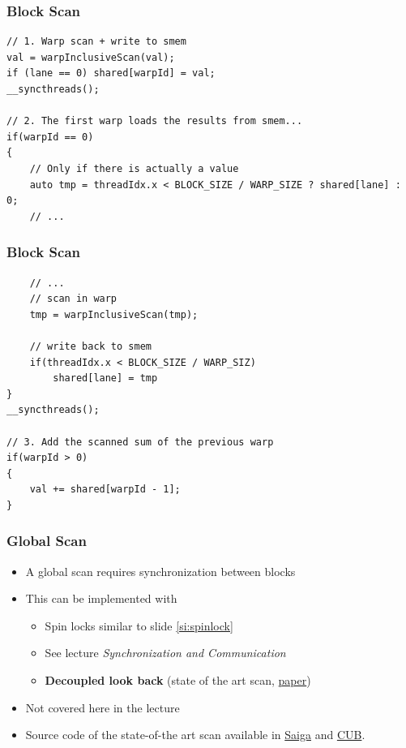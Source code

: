 \documentclass[aspectratio=169,handout]{beamer}
\begin{document}
\begin{frame}[fragile]
\frametitle{Block Scan}

\begin{lstlisting}
// 1. Warp scan + write to smem
val = warpInclusiveScan(val);
if (lane == 0) shared[warpId] = val;
__syncthreads();

// 2. The first warp loads the results from smem...
if(warpId == 0)
{
	// Only if there is actually a value
	auto tmp = threadIdx.x < BLOCK_SIZE / WARP_SIZE ? shared[lane] : 0;
	// ...
\end{lstlisting}
\end{frame}


\begin{frame}[fragile]
\frametitle{Block Scan}


\begin{lstlisting}
	// ...
	// scan in warp
	tmp = warpInclusiveScan(tmp); 
	
	// write back to smem
	if(threadIdx.x < BLOCK_SIZE / WARP_SIZ)
		shared[lane] = tmp
}
__syncthreads();

// 3. Add the scanned sum of the previous warp
if(warpId > 0)
{
	val += shared[warpId - 1];
}
\end{lstlisting}
\end{frame}


\begin{frame}[fragile]
\frametitle{Global Scan}
\begin{itemize}
	\item A global scan requires synchronization between blocks
	\item<2-> This can be implemented with
	\begin{itemize}
		\item<2-> Spin locks similar to slide \ref{si:spinlock}
		\item<2->[$\rightarrow$] See lecture \textit{Synchronization and Communication}
		\item<3-> \textbf{Decoupled look back} (state of the art scan, \href{https://research.nvidia.com/sites/default/files/pubs/2016-03_Single-pass-Parallel-Prefix/nvr-2016-002.pdf}{paper})
	\end{itemize} 
	\item<3-> Not covered here in the lecture
	\item<4-> Source code of the state-of-the art scan available in \href{https://github.com/darglein/saiga/blob/master/src/saiga/cuda/scan.h}{Saiga} and \href{https://nvlabs.github.io/cub/structcub_1_1_device_scan.html}{CUB}.
\end{itemize}
\end{frame}
\end{document}
